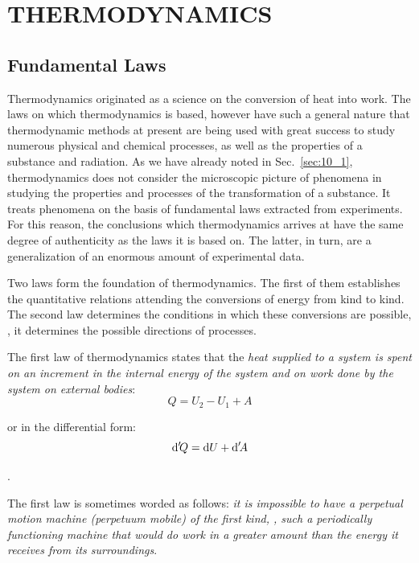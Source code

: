 

\chapter{THERMODYNAMICS}\label{chap:12}

\section{Fundamental Laws}\label{sec:12_1}

Thermodynamics originated as a science on the conversion of heat into work. The laws on which thermodynamics is based, however have such a general nature that thermodynamic methods at present are being used with great success to study numerous physical and chemical processes, as well as the properties of a substance and radiation. As we have already noted in Sec.~\ref{sec:10_1}, thermodynamics does not consider the microscopic picture of phenomena in studying the properties and processes of the transformation of a substance. It treats phenomena on the basis of fundamental laws extracted from experiments. For this reason, the conclusions which thermodynamics arrives at have the same degree of authenticity as the laws it is based on. The latter, in turn, are a generalization of an enormous amount of experimental data.

Two laws form the foundation of thermodynamics. The first of them establishes the quantitative relations attending the conversions of energy from kind to kind. The second law determines the conditions in which these conversions are possible, \ie, it determines the possible directions of processes.

The first law of thermodynamics states that the \textit{heat supplied to a system is spent on an increment in the internal energy of the system and on work done by the system on external bodies}:
\begin{equation}\label{eq:12_1}
	Q = U_2 - U_1 + A
\end{equation}

\noindent
or in the differential form:
\begin{equation}\label{eq:12_2}
	\mathrm{d}'\!Q = \mathrm{d} U + \mathrm{d}'\!A
\end{equation}

.

The first law is sometimes worded as follows: \textit{it is impossible to have a perpetual motion machine (perpetuum mobile) of the first kind, \ie, such a periodically functioning machine that would do work in a greater amount than the energy it receives from its surroundings}.

